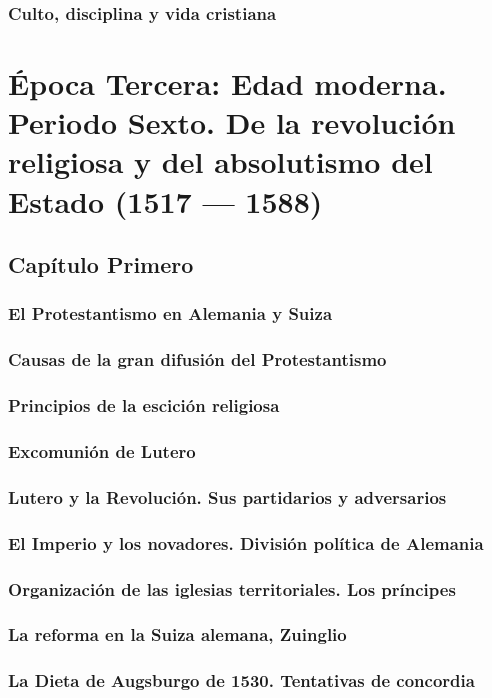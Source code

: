 \raggedbottom{} \documentclass[12pt, a4paper]{book}
\begin{document}
\section{Culto, disciplina y vida cristiana}
\part{Época Tercera: Edad moderna. Periodo Sexto. De la revolución religiosa y del absolutismo del Estado (1517 --- 1588)}
\chapter{Capítulo Primero}
\section{El Protestantismo en Alemania y Suiza}
\section{Causas de la gran difusión del Protestantismo}
\section{Principios de la escición religiosa}
\section{Excomunión de Lutero}
\section{Lutero y la Revolución. Sus partidarios y adversarios}
\section{El Imperio y los novadores. División política de Alemania}
\section{Organización de las iglesias territoriales. Los príncipes}
\section{La reforma en la Suiza alemana, Zuinglio}
\section{La Dieta de Augsburgo de 1530. Tentativas de concordia}
\end{document}
